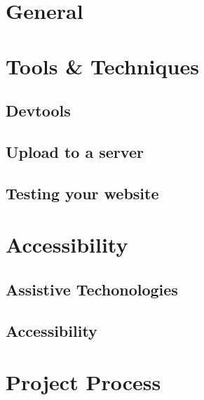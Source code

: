 \documentclass[b5paper,openany]{book}
\begin{document}
\tp


\tableofcontents




\chapter{General}



\chapter{Tools \& Techniques}

\section{Devtools}


\section{Upload to a server}
% 

\section{Testing your website}
% 


\chapter{Accessibility}

\section{Assistive Techonologies}
% 

\section{Accessibility}



\chapter{Project Process}
\end{document}
